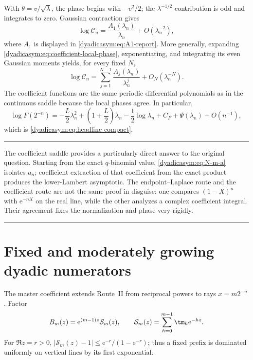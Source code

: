 \documentclass[11pt,oneside]{article}
\theoremstyle{definition}
\theoremstyle{remark}
\newcommand{\e}{\mathrm e}
\newenvironment{boxedremark}{%
  \par\smallskip\noindent\begin{center}\begin{minipage}{0.94\textwidth}%
  \color{black}\hrule\vspace{0.6em}\small
}{%
  \vspace{0.6em}\hrule\end{minipage}\end{center}\smallskip
}
\begin{document}
With $\theta=v/\sqrt\lambda$, the phase begins with $-v^2/2$; the
$\lambda^{-1/2}$ contribution is odd and integrates to zero.  Gaussian contraction gives
\begin{equation}
 \log\mathcal C_n
 =\frac{A_1(\lambda_n)}{\lambda_n}+O(\lambda_n^{-2}),      \label{dyadicasym:eq:Cn-first}
\end{equation}
where $A_1$ is displayed in \eqref{dyadicasym:eq:A1-report}.  More generally, expanding
\eqref{dyadicasym:eq:coefficient-local-phase}, exponentiating, and integrating its even
Gaussian moments yields, for every fixed $N$,
\begin{equation}
 \log\mathcal C_n
 =\sum_{j=1}^{N-1}\frac{A_j(\lambda_n)}{\lambda_n^j}
 +O_N(\lambda_n^{-N}).                                    \label{dyadicasym:eq:Cn-all-orders}
\end{equation}
The coefficient functions are the same periodic differential polynomials as in the
continuous saddle because the local phases agree.  In particular,
\begin{equation}
 \log F(2^{-n})=
 -\frac L2\lambda_n^2+
 \left(1+\frac L2\right)\lambda_n-\frac12\log\lambda_n
 +C_F+\Psi(\lambda_n)+O(n^{-1}),                           \label{dyadicasym:eq:saddle-final}
\end{equation}
which is \eqref{dyadicasym:eq:headline-compact}.

\begin{boxedremark}
The coefficient saddle provides a particularly direct answer to the original question.
Starting from the exact $q$-binomial value, \eqref{dyadicasym:eq:N-m-a} isolates $a_n$; coefficient
extraction of that coefficient from the exact product produces the lower-Lambert asymptotic.
The endpoint--Laplace route and the coefficient route are not the same proof in disguise:
one compares $(1-X)^n$ with $\e^{-nX}$ on the real line, while the other analyzes a complex
coefficient integral.  Their agreement fixes the normalization and phase very rigidly.
\end{boxedremark}

\section{Fixed and moderately growing dyadic numerators}
\label{dyadicasym:sec:fixed-numerator}

The master coefficient extends Route~II from reciprocal powers to rays $x=m2^{-n}$.
Factor
\begin{equation}
 B_m(z)=\e^{(m-1)z}\mathcal S_m(z),\qquad
 \mathcal S_m(z)=\sum_{h=0}^{m-1}\tm_h\e^{-hz}.
 \label{dyadicasym:eq:fixed-prefix-factor}
\end{equation}
For $\Re z=r>0$,
$|\mathcal S_m(z)-1|\le\e^{-r}/(1-\e^{-r})$; thus a fixed prefix is dominated
uniformly on vertical lines by its first exponential.
\end{document}
